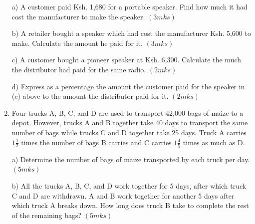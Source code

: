 \documentclass[
  a4paperpaper,
]{scrbook}
\begin{document}
\begin{tcolorbox}
\begin{enumerate}
  a) A customer paid Ksh. 1,680 for a portable speaker. Find how much it
  had cost the manufacturer to make the speaker. \((3mks)\)

  b) A retailer bought a speaker which had cost the manufacturer Ksh.
  5,600 to make. Calculate the amount he paid for it. \((3mks)\)

  c) A customer bought a pioneer speaker at Ksh. 6,300. Calculate the
  much the distributor had paid for the same radio. \((2mks)\)

  d) Express as a percentage the amount the customer paid for the
  speaker in (c) above to the amount the distributor paid for it.
  \((2mks)\)
\item
  Four trucks A, B, C, and D are used to transport 42,000 bags of maize
  to a depot. However, trucks A and B together take 40 days to transport
  the same number of bags while trucks C and D together take 25 days.
  Truck A carries \(1\frac{1}{2}\) times the number of bags B carries
  and C carries \(1\frac{4}{5}\) times as much as D.

  a) Determine the number of bags of maize transported by each truck per
  day.\((5mks)\)

  b) All the trucks A, B, C, and D work together for 5 days, after which
  truck C and D are withdrawn. A and B work together for another 5 days
  after which truck A breaks down. How long does truck B take to
  complete the rest of the remaining bags? \((5mks)\)
\end{enumerate}

\end{tcolorbox}
\end{document}
